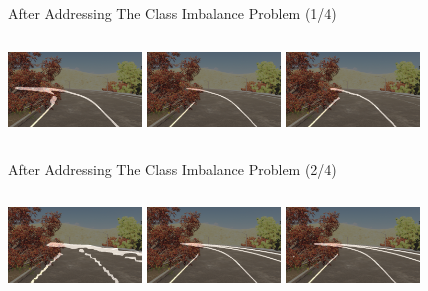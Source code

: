 \documentclass[aspectratio=169]{beamer}
\begin{document}
\begin{frame}{After Addressing The Class Imbalance Problem (1/4)}
\begin{columns}[t]
        \includegraphics[width=\columnwidth,height= 2cm]{images/binseg_ce_resa.png}
        \centering
        \includegraphics[width=\columnwidth,height= 2cm]{images/binseg_dice_resa.png}
        \includegraphics[width=\columnwidth,height= 2cm]{images/binseg_focal_resa.png}
        \centering
    \end{columns}

\end{frame}
\begin{frame}{After Addressing The Class Imbalance Problem (2/4)}
\begin{columns}[t]
        \includegraphics[width=\columnwidth,height= 2cm]{images/full_res18_scnn_focal.png}
        \centering
        \includegraphics[width=\columnwidth,height= 2cm]{images/Resa_r18_full_dice.png}
        \includegraphics[width=\columnwidth,height= 2cm]{images/Resa_r50_full_dice.png}
        \centering
    \end{columns}

\end{frame}
\end{document}

